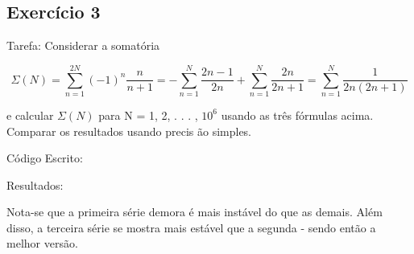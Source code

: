 \documentclass[12pt, a4paper]{article} %
\begin{document}
    \subsection{Exerc\'icio 3}

        Tarefa: Considerar a somat\'oria

        \begin{equation} \Sigma (N) = \sum_{n=1}^{2N} (-1)^n\frac{n}{n+1} = - \sum_{n=1}^N \frac{2n-1}{2n} + \sum_{n=1}^N \frac{2n}{2n+1} = \sum_{n=1}^N \frac{1}{2n(2n+1)} \end{equation}

        e calcular $\Sigma (N)$ para N = 1, 2, . . . , $10^6$ usando as tr\^es f\'ormulas acima. Comparar os resultados usando precis \~ao simples.

        C\'odigo Escrito:
        

        Resultados:

        Nota-se que a primeira s\'erie demora \'e mais inst\'avel do que as demais. Al\'em disso, a terceira s\'erie se mostra mais est\'avel que a segunda - sendo ent\~ao a melhor vers\~ao.
\end{document}

